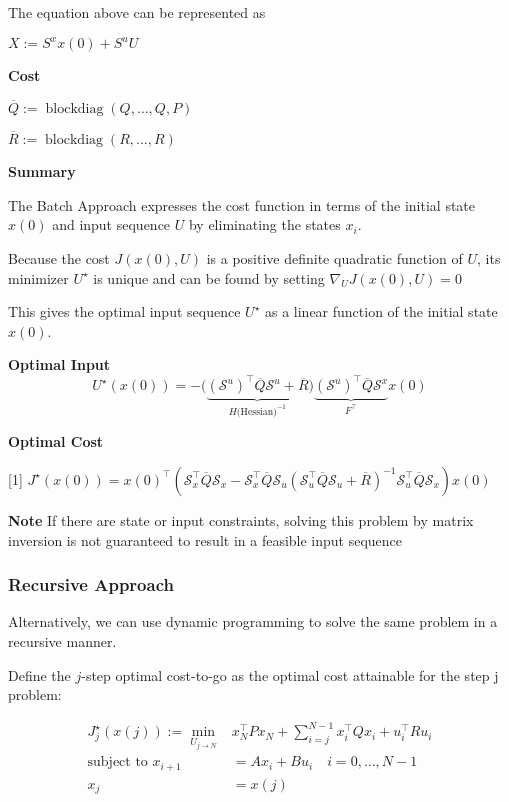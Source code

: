 The equation above can be represented as

$X := S^x x(0) + S^u U$

\textbf{Cost}

$\overline{Q} := \mathop{\mathrm{blockdiag}}(Q,\dots, Q,P)$

$\overline{R} := \mathop{\mathrm{blockdiag}}(R,\dots, R)$


\textbf{Summary}

The Batch Approach expresses the cost function in terms of
the initial state $x(0)$ and input sequence $U$
by eliminating the states $x_i$.

Because the cost $J(x(0), U)$ is a
positive definite quadratic function of $U$,
its minimizer $U^\star$ is unique and can be found
by setting $\nabla_U J(x(0), U) = 0$

This gives the optimal input sequence $U^\star$
as a linear function of the initial state $x(0)$.

\textbf{Optimal Input}
\[
	U^\star(x(0)) =
	- \bigl(
	\underbrace{
			(\mathcal{S}^u)^\top \overline{Q} \mathcal{S}^u + \overline{R}
		}_{H\text{(Hessian)}^{-1}}
	\bigr)
	\underbrace{
		(\mathcal{S}^u)^\top \overline{Q}\mathcal{S}^x
	}_ {F^\top}
	x(0)
\]

\textbf{Optimal Cost}

\scalebox{0.97}[1]{
	$\scriptstyle
		J^\star(x(0)) = x(0)^\top (
		\mathcal{S}_x^\top \overline{Q} \mathcal{S}_x
		- \mathcal{S}_x^\top \overline{Q} \mathcal{S}_u
		(\mathcal{S}_u^\top \overline{Q} \mathcal{S}_u
		+ \overline{R})^{-1}
		\mathcal{S}_u^\top \overline{Q} \mathcal{S}_x
		)x(0)$
}

\textbf{Note} If there are state or input constraints,
solving this problem by matrix inversion
is not guaranteed to result in a feasible input sequence

\subsubsection{Recursive Approach}

Alternatively, we can use dynamic programming
to solve the same problem in a recursive manner.

Define the $j$-step optimal cost-to-go as the
optimal cost attainable for the step j problem:

\[\begin{aligned}
		J_j^\star(x(j)) :=
		\min_{U_{j\to N}} & x_N^\top P x_N \!+
		\sum_{i=j}^{N-1}x_i^\top Q x_i + u_i^\top R u_i
		\\
		\text{subject to  }
		x_{i+1}           & = Ax_i+Bu_i
		\quad i  = 0,\dots,N-1
		\\
		x_j               & = x(j)
	\end{aligned}\]

